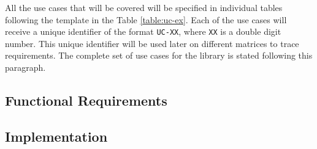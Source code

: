 All the use cases that will be covered will be specified in individual tables
following the template in the Table \ref{table:uc-ex}. Each of the use cases
will receive a unique identifier of the format \texttt{UC-XX}, where
\texttt{XX} is a double digit number. This unique identifier will be used later
on different matrices to trace requirements. The complete set of use cases for
the library is stated following this paragraph.

\subsection{Functional Requirements}
\subsection{Implementation}

\newpage
